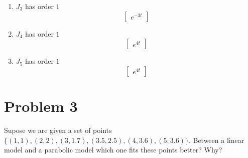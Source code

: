 \documentclass{article}
\begin{document}
\begin{enumerate}[1.]
\begin{enumerate}[1.]
\item $J_3$ has order $1$
$$
\begin{bmatrix}
e^{-3t}
\end{bmatrix}
$$

\item $J_4$ has order $1$
$$
\begin{bmatrix}
e^{4t}
\end{bmatrix}
$$

\item $J_5$ has order $1$
$$
\begin{bmatrix}
e^{4t}
\end{bmatrix}
$$
\end{enumerate}

\end{enumerate}

\section*{Problem 3}
Supose we are given a set of points $\{(1,1), (2,2), (3,1.7), (3.5, 2.5), (4,3.6), (5,3.6)\}$.
Between a linear model and a parabolic model which one fits these points better?
Why?
\end{document}
